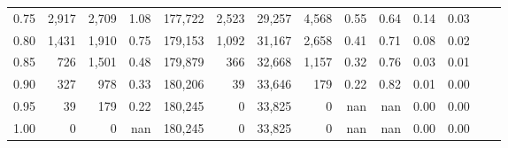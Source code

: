 \begin{tabular}{rrrrrrrrrrrrrr}
0.75 &   2,917 &  2,709 &    1.08 &  177,722 &    2,523 &  29,257 &   4,568 &  0.55 &  0.64 &  0.14 &      0.03 \\
0.80 &   1,431 &  1,910 &    0.75 &  179,153 &    1,092 &  31,167 &   2,658 &  0.41 &  0.71 &  0.08 &      0.02 \\
0.85 &     726 &  1,501 &    0.48 &  179,879 &      366 &  32,668 &   1,157 &  0.32 &  0.76 &  0.03 &      0.01 \\
0.90 &     327 &    978 &    0.33 &  180,206 &       39 &  33,646 &     179 &  0.22 &  0.82 &  0.01 &      0.00 \\
0.95 &      39 &    179 &    0.22 &  180,245 &        0 &  33,825 &       0 &   nan &   nan &  0.00 &      0.00 \\
1.00 &       0 &      0 &     nan &  180,245 &        0 &  33,825 &       0 &   nan &   nan &  0.00 &      0.00 \\
\bottomrule
\end{tabular}
